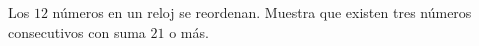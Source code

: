 Los $12$ números en un reloj se reordenan. Muestra que existen tres números consecutivos con suma $21$ o más.